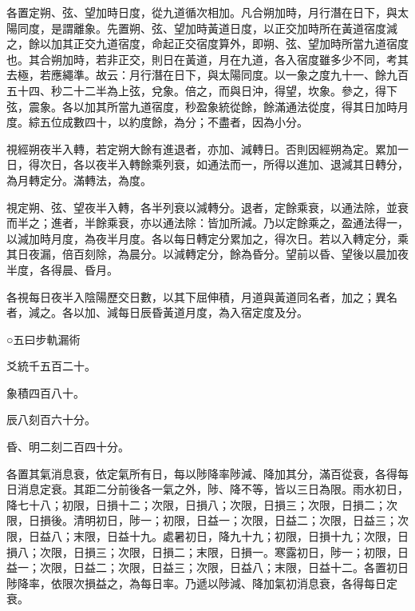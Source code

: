 \begin{pinyinscope}
 各置定朔、弦、望加時日度，從九道循次相加。凡合朔加時，月行潛在日下，與太陽同度，是謂離象。先置朔、弦、望加時黃道日度，以正交加時所在黃道宿度減之，餘以加其正交九道宿度，命起正交宿度算外，即朔、弦、望加時所當九道宿度也。其合朔加時，若非正交，則日在黃道，月在九道，各入宿度雖多少不同，考其去極，若應繩準。故云：月行潛在日下，與太陽同度。以一象之度九十一、餘九百五十四、秒二十二半為上弦，兌象。倍之，而與日沖，得望，坎象。參之，得下弦，震象。各以加其所當九道宿度，秒盈象統從餘，餘滿通法從度，得其日加時月度。綜五位成數四十，以約度餘，為分；不盡者，因為小分。



 視經朔夜半入轉，若定朔大餘有進退者，亦加、減轉日。否則因經朔為定。累加一日，得次日，各以夜半入轉餘乘列衰，如通法而一，所得以進加、退減其日轉分，為月轉定分。滿轉法，為度。



 視定朔、弦、望夜半入轉，各半列衰以減轉分。退者，定餘乘衰，以通法除，並衰而半之；進者，半餘乘衰，亦以通法除：皆加所減。乃以定餘乘之，盈通法得一，以減加時月度，為夜半月度。各以每日轉定分累加之，得次日。若以入轉定分，乘其日夜漏，倍百刻除，為晨分。以減轉定分，餘為昏分。望前以昏、望後以晨加夜半度，各得晨、昏月。



 各視每日夜半入陰陽歷交日數，以其下屈伸積，月道與黃道同名者，加之；異名者，減之。各以加、減每日辰昏黃道月度，為入宿定度及分。



 ○五曰步軌漏術



 爻統千五百二十。



 象積四百八十。



 辰八刻百六十分。



 昏、明二刻二百四十分。



 各置其氣消息衰，依定氣所有日，每以陟降率陟減、降加其分，滿百從衰，各得每日消息定衰。其距二分前後各一氣之外，陟、降不等，皆以三日為限。雨水初日，降七十八；初限，日損十二；次限，日損八；次限，日損三；次限，日損二；次限，日損後。清明初日，陟一；初限，日益一；次限，日益二；次限，日益三；次限，日益八；末限，日益十九。處暑初日，降九十九；初限，日損十九；次限，日損八；次限，日損三；次限，日損二；末限，日損一。寒露初日，陟一；初限，日益一；次限，日益二；次限，日益三；次限，日益八；末限，日益十二。各置初日陟降率，依限次損益之，為每日率。乃遞以陟減、降加氣初消息衰，各得每日定衰。




\end{pinyinscope}
